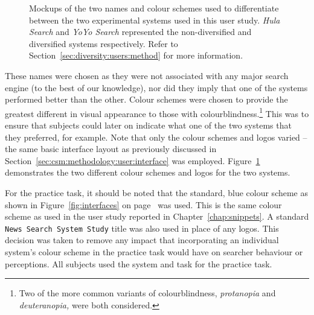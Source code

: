 \begin{figure}[t!]
    \centering
    \caption[Diversity user study interface mockups]{Mockups of the two names and colour schemes used to differentiate between the two experimental systems used in this user study. \emph{Hula Search} and \emph{YoYo Search} represented the non-diversified and diversified systems respectively. Refer to Section~\ref{sec:diversity:users:method} for more information.}
    \label{fig:interface_headers}
\end{figure}

These names were chosen as they were not associated with any major search engine (to the best of our knowledge), nor did they imply that one of the systems performed better than the other. Colour schemes were chosen to provide the greatest different in visual appearance to those with colourblindness.\footnote{Two of the more common variants of colourblindness, \emph{protanopia} and \emph{deuteranopia,} were both considered.} This was to ensure that subjects could later on indicate what one of the two systems that they preferred, for example. Note that only the colour schemes and logos varied -- the same basic interface layout as previously discussed in Section~\ref{sec:csm:methodology:user:interface} was employed. Figure~\ref{fig:interface_headers} demonstrates the two different colour schemes and logos for the two systems.

For the practice task, it should be noted that the standard, blue colour scheme as shown in Figure~\ref{fig:interfaces} on page~\pageref{fig:interfaces} was used. This is the same colour scheme as used in the user study reported in Chapter~\ref{chap:snippets}. A standard \texttt{News Search System Study} title was also used in place of any logos. This decision was taken to remove any impact that incorporating an individual system's colour scheme in the practice task would have on searcher behaviour or perceptions. All subjects used the  system and task for the practice task.

